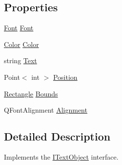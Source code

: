 \subsection*{Properties}
\begin{DoxyCompactItemize}
\item 
\hyperlink{class_tri_devs_1_1_tri_engine_1_1_text_1_1_font}{Font} \hyperlink{class_tri_devs_1_1_tri_engine_1_1_text_1_1_text_object_a325430b44bea322da0fb628336287098}{Font}
\item 
\hyperlink{struct_tri_devs_1_1_tri_engine_1_1_color}{Color} \hyperlink{class_tri_devs_1_1_tri_engine_1_1_text_1_1_text_object_a7179c9aa04905b587827ba73c5c43cea}{Color}
\item 
string \hyperlink{class_tri_devs_1_1_tri_engine_1_1_text_1_1_text_object_a0b05792d9c7d5bb4cf5116bc2d6700a9}{Text}
\item 
Point$<$ int $>$ \hyperlink{class_tri_devs_1_1_tri_engine_1_1_text_1_1_text_object_a2875cf8ae2489ddbf5dbc13457c1ccf4}{Position}
\item 
\hyperlink{struct_tri_devs_1_1_tri_engine_1_1_rectangle}{Rectangle} \hyperlink{class_tri_devs_1_1_tri_engine_1_1_text_1_1_text_object_a734cf579ae63036f80f4915397271a10}{Bounds}
\item 
Q\-Font\-Alignment \hyperlink{class_tri_devs_1_1_tri_engine_1_1_text_1_1_text_object_a1dd71c94fe0ae82cf69d3488b1bef05c}{Alignment}
\end{DoxyCompactItemize}


\subsection{Detailed Description}
Implements the \hyperlink{interface_tri_devs_1_1_tri_engine_1_1_text_1_1_i_text_object}{I\-Text\-Object} interface. 



